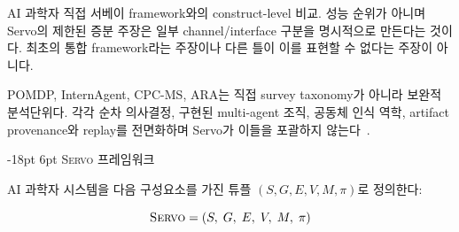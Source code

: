 \documentclass[11pt]{article}
\makeatletter
\renewcommand\section{\@startsection{section}{1}{\z@}%
  {-18pt \@plus -4pt \@minus -2pt}%
  {6pt \@plus 2pt}%
  {\normalfont\large\bfseries}}
\newcommand{\sgmvpi}{$(S, G, E, V, M, \pi)$}
\newcommand{\framework}{\textsc{Servo}}
\makeatother
\begin{document}
\begin{table}[h]
\centering
\scriptsize
\setlength{\tabcolsep}{3pt}
\resizebox{\textwidth}{!}{}
\caption{AI 과학자 직접 서베이 framework와의 construct-level 비교. 성능 순위가 아니며 Servo의 제한된 증분 주장은 일부 channel/interface 구분을 명시적으로 만든다는 것이다. 최초의 통합 framework라는 주장이나 다른 틀이 이를 표현할 수 없다는 주장이 아니다.}
\label{tab:framework-crosswalk}
\end{table}

POMDP, InternAgent, CPC-MS, ARA는 직접 survey taxonomy가 아니라 보완적 분석단위다. 각각 순차 의사결정, 구현된 multi-agent 조직, 공동체 인식 역학, artifact provenance와 replay를 전면화하며 Servo가 이들을 포괄하지 않는다~\citep{kaelbling1998pomdp,zhang2025novelseek,taniguchi2024cpc,liu2026lasthuman}.

\section{\framework{} 프레임워크}
\label{sec:framework}

AI 과학자 시스템을 다음 구성요소를 가진 튜플 \sgmvpi{}로 정의한다:

\begin{equation}
  \text{\framework{}} = (S,\; G,\; E,\; V,\; M,\; \pi)
\end{equation}
\end{document}
